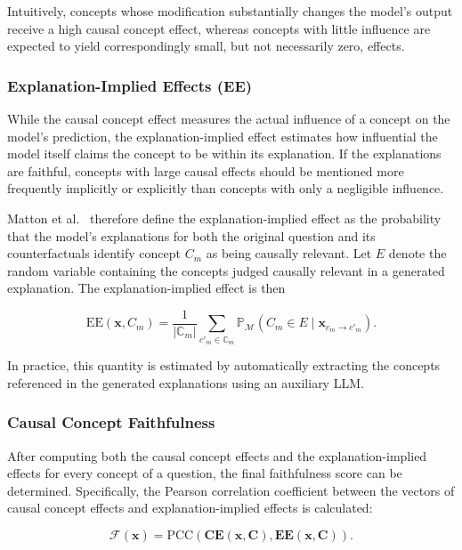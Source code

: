 Intuitively, concepts whose modification substantially changes the model's output receive a high causal concept effect, whereas concepts with little influence are expected to yield correspondingly small, but not necessarily zero, effects.

\subsubsection{Explanation-Implied Effects (EE)}

While the causal concept effect measures the actual influence of a concept on the model's prediction, the explanation-implied effect estimates how influential the model itself claims the concept to be within its explanation. If the explanations are faithful, concepts with large causal effects should be mentioned more frequently implicitly or explicitly than concepts with only a negligible influence.

Matton et al.~\cite{mattonWalkTalkMeasuring2024} therefore define the explanation-implied effect as the probability that the model's explanations for both the original question and its counterfactuals identify concept $C_m$ as being causally relevant. Let $E$ denote the random variable containing the concepts judged causally relevant in a generated explanation. The explanation-implied effect is then

\begin{equation}
	\label{eq:ee}
	\mathrm{EE}(\mathbf{x},C_m)=
	\frac{1}{|\mathbb{C}_m|}
	\sum_{c'_m \in \mathbb{C}_m}
	\mathbb{P}_{\mathcal{M}}(C_m \in E \mid \mathbf{x}_{c_m \rightarrow c'_m}).
\end{equation}

In practice, this quantity is estimated by automatically extracting the concepts referenced in the generated explanations using an auxiliary LLM.

\subsubsection{Causal Concept Faithfulness}

After computing both the causal concept effects and the explanation-implied effects for every concept of a question, the final faithfulness score can be determined. Specifically, the Pearson correlation coefficient between the vectors of causal concept effects and explanation-implied effects is calculated:

\begin{equation}
	\label{eq:faithfulness}
	\mathcal{F}(\mathbf{x})=
	\mathrm{PCC}
	\left(
	\mathbf{CE}(\mathbf{x},\mathbf{C}),
	\mathbf{EE}(\mathbf{x},\mathbf{C})
	\right).
\end{equation}

